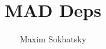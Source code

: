 
\renewcommand{\images}{http://synrc.com/apps/mad/doc/images}

\title{MAD Deps}
\author{Maxim Sokhatsky}



